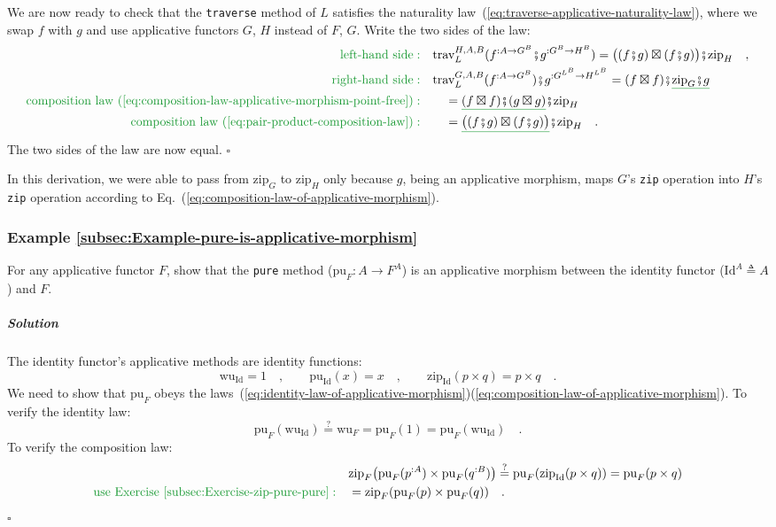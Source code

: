We are now ready to check that the \lstinline!traverse! method of
$L$ satisfies the naturality law~(\ref{eq:traverse-applicative-naturality-law}),
where we swap $f$ with $g$ and use applicative functors $G$, $H$
instead of $F$, $G$. Write the two sides of the law:
\begin{align*}
{\color{greenunder}\text{left-hand side}:}\quad & \text{trav}_{L}^{H,A,B}(f^{:A\rightarrow G^{B}}\bef g^{:G^{B}\rightarrow H^{B}})=\big((f\bef g)\boxtimes(f\bef g)\big)\bef\text{zip}_{H}\quad,\\
{\color{greenunder}\text{right-hand side}:}\quad & \text{trav}_{L}^{G,A,B}(f^{:A\rightarrow G^{B}})\bef g^{:G^{L^{B}}\rightarrow H^{L^{B}}}=(f\boxtimes f)\bef\gunderline{\text{zip}_{G}\bef g}\\
{\color{greenunder}\text{composition law~(\ref{eq:composition-law-applicative-morphism-point-free})}:}\quad & \quad=\gunderline{(f\boxtimes f)\bef(g\boxtimes g)}\bef\text{zip}_{H}\\
{\color{greenunder}\text{composition law~(\ref{eq:pair-product-composition-law})}:}\quad & \quad=\gunderline{\big((f\bef g)\boxtimes(f\bef g)\big)}\bef\text{zip}_{H}\quad.
\end{align*}
The two sides of the law are now equal. $\square$

In this derivation, we were able to pass from $\text{zip}_{G}$ to
$\text{zip}_{H}$ only because $g$, being an applicative morphism,
maps $G$\textsf{'}s \lstinline!zip! operation into $H$\textsf{'}s \lstinline!zip!
operation according to Eq.~(\ref{eq:composition-law-of-applicative-morphism}).

\subsubsection{Example \label{subsec:Example-pure-is-applicative-morphism}\ref{subsec:Example-pure-is-applicative-morphism}}

For any applicative functor $F$, show that the \lstinline!pure!
method ($\text{pu}_{F}:A\rightarrow F^{A}$) is an applicative morphism
between the identity functor ($\text{Id}^{A}\triangleq A$) and $F$.

\subparagraph{Solution}

The identity functor\textsf{'}s applicative methods are identity functions:
\[
\text{wu}_{\text{Id}}=1\quad,\quad\quad\text{pu}_{\text{Id}}(x)=x\quad,\quad\quad\text{zip}_{\text{Id}}(p\times q)=p\times q\quad.
\]
We need to show that $\text{pu}_{F}$ obeys the laws~(\ref{eq:identity-law-of-applicative-morphism})\textendash (\ref{eq:composition-law-of-applicative-morphism}).
To verify the identity law:
\[
\text{pu}_{F}(\text{wu}_{\text{Id}})\overset{?}{=}\text{wu}_{F}=\text{pu}_{F}(1)=\text{pu}_{F}(\text{wu}_{\text{Id}})\quad.
\]
To verify the composition law:
\begin{align*}
 & \text{zip}_{F}\big(\text{pu}_{F}(p^{:A})\times\text{pu}_{F}(q^{:B})\big)\overset{?}{=}\text{pu}_{F}(\text{zip}_{\text{Id}}(p\times q))=\text{pu}_{F}(p\times q)\\
{\color{greenunder}\text{use Exercise~\ref{subsec:Exercise-zip-pure-pure}}:}\quad & =\text{zip}_{F}(\text{pu}_{F}(p)\times\text{pu}_{F}(q))\quad.
\end{align*}
$\square$

